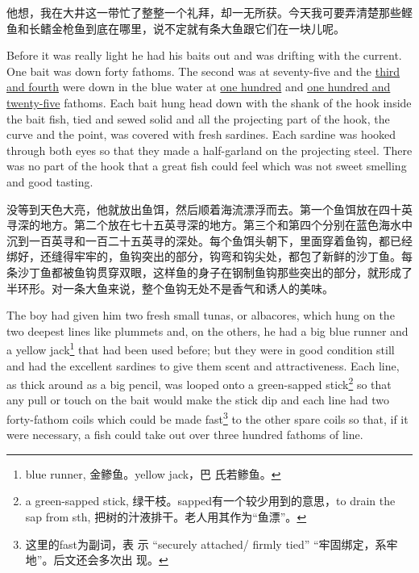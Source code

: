 \begin{paracol}{2}
他想，我在大井这一带忙了整整一个礼拜，却一无所获。今天我可要弄清楚那些鲣鱼和长鳍金枪鱼到底在哪里，说不定就有条大鱼跟它们在一块儿呢。

\switchcolumn*

Before it was really light he had his baits out and was \gls{drifting} with
the current. One bait was down forty fathoms. The second was at seventy-five
and the \uline{third and fourth} were down in the blue water at \uline{one hundred}
and \uline{one hundred and twenty-five} fathoms. Each bait \gls{hung} head
down with the \gls{shank} of the hook inside the bait fish, \gls{tied} and
\gls{sewed} \gls{solid} and all the \gls{projecting} part of the hook, the
\gls{curve} and the point, was covered with fresh sardines. Each sardine was
hooked through both eyes so that they made a half-\gls{garland} on the
projecting \gls{steel}. There was no part of the hook that a great fish
could feel which was not sweet smelling and good tasting.

\switchcolumn

没等到天色大亮，他就放出鱼饵，然后顺着海流漂浮而去。第一个鱼饵放在四十英寻深的地方。第二个放在七十五英寻深的地方。第三个和第四个分别在蓝色海水中沉到一百英寻和一百二十五英寻的深处。每个鱼饵头朝下，里面穿着鱼钩，都已经绑好，还缝得牢牢的，鱼钩突出的部分，钩弯和钩尖处，都包了新鲜的沙丁鱼。每条沙丁鱼都被鱼钩贯穿双眼，这样鱼的身子在钢制鱼钩那些突出的部分，就形成了半环形。对一条大鱼来说，整个鱼钩无处不是香气和诱人的美味。

\switchcolumn*

The boy had given him two fresh small tunas, or albacores, which hung on the
two deepest lines like \glspl{plummet} and, on the others, he had a big blue
\gls{runner} and a yellow jack\footnote{blue runner, 金鲹鱼。yellow jack，巴
  氏若鲹鱼。} that had been used before; but they were in good
\gls{condition} still and had the \gls{excellent} sardines to give them
\gls{scent} and \gls{attractiveness}. Each line, as \gls{thick} around as a
big pencil, was looped onto a green-sapped \gls{stick}\footnote{a
  green-sapped stick, 绿干枝。sapped有一个较少用到的意思，to drain the sap
  from sth, 把树的汁液排干。老人用其作为“鱼漂”。} so that any pull or
touch on the bait would make the stick dip and each line had two
forty-fathom coils which could be made fast\footnote{这里的fast为副词，表
  示 ``securely attached/ firmly tied'' “牢固绑定，系牢地”。后文还会多次出
  现。} to the other \gls{spare} coils so that, if it were necessary, a fish
could take out over three hundred fathoms of line.


\end{paracol}
